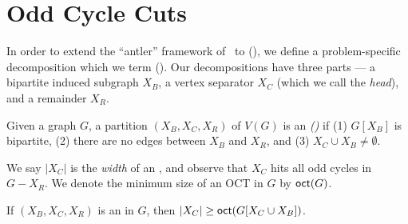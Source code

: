 \section{Odd Cycle Cuts} \label{sec:oct:cut}
In order to extend the ``antler'' framework of~\cite{DonkersJ24} to \PrbOCTLong (\PrbOCT), 
we define a problem-specific decomposition which we term \emph{\Occs} (\occs). Our decompositions have three parts --- a bipartite induced subgraph $X_B$, a vertex separator $X_C$ (which we call the \emph{head}), and a remainder $X_R$.  


\begin{definition}[\Occ]
    Given a graph $G$, a partition $(X_B, X_C, X_R)$ of $V(G)$ is an \emph{\Occ (\occ)}
    if (1) $G[X_B]$ is bipartite,
    (2) there are no edges between $X_B$ and $X_R$, and
    (3) $X_C \cup X_B \neq \emptyset$.
\end{definition}

We say $|X_C|$ is the \emph{width} of an \occ, and 
observe that $X_C$ hits all odd cycles in $G - X_R$.
We denote the minimum size of an OCT in $G$ by $\textnormal{\textsf{oct}}(G)$.

\begin{observation}
    If $(X_B, X_C, X_R)$ is an \occ in $G$, then $|X_C| \geq \textnormal{\textsf{oct}}(G[X_C \cup X_B])$.
\end{observation}

